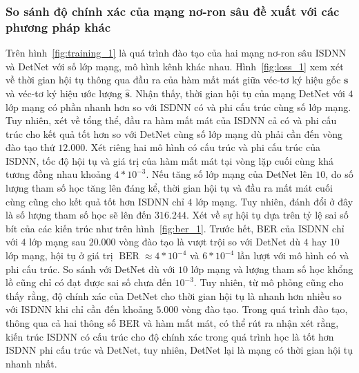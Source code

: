 \subsubsection{So sánh độ chính xác của mạng nơ-ron sâu đề xuất với các phương pháp khác}
Trên hình~\ref{fig:training_1} là quá trình đào tạo của hai mạng nơ-ron sâu ISDNN và DetNet với số lớp mạng, mô hình kênh khác nhau. Hình~\ref{fig:loss_1} xem xét về thời gian hội tụ thông qua đầu ra của hàm mất mát giữa véc-tơ ký hiệu gốc $\mathbf{s}$ và véc-tơ ký hiệu ước lượng $\mathbf{\hat{s}}$. Nhận thấy, thời gian hội tụ của mạng DetNet với $4$ lớp mạng có phần nhanh hơn so với ISDNN có và phi cấu trúc cùng số lớp mạng. Tuy nhiên, xét về tổng thể, đầu ra hàm mất mát của ISDNN cả có và phi cấu trúc cho kết quả tốt hơn so với DetNet cùng số lớp mạng dù phải cần đến vòng đào tạo thứ $12.000$. Xét riêng hai mô hình có cấu trúc và phi cấu trúc của ISDNN, tốc độ hội tụ và giá trị của hàm mất mát tại vòng lặp cuối cùng khá tương đồng nhau khoảng $4 * 10^{-3}$. Nếu tăng số lớp mạng của DetNet lên $10$, do số lượng tham số học tăng lên đáng kể, thời gian hội tụ và đầu ra mất mát cuối cùng cũng cho kết quả tốt hơn ISDNN chỉ $4$ lớp mạng. Tuy nhiên, đánh đổi ở đây là số lượng tham số học sẽ lên đến $316.244$. Xét về sự hội tụ dựa trên tỷ lệ sai số bít của các kiến trúc như trên hình~\ref{fig:ber_1}. Trước hết, BER của ISDNN chỉ với $4$ lớp mạng sau $20.000$ vòng đào tạo là vượt trội so với DetNet dù $4$ hay $10$ lớp mạng, hội tụ ở giá trị $\operatorname{BER}\approx 4 * 10^{-4}$ và $6*10^{-4}$ lần lượt với mô hình có và phi cấu trúc. So sánh với DetNet dù với $10$ lớp mạng và lượng tham số học khổng lồ cũng chỉ có đạt được sai số chưa đến $10^{-3}$. Tuy nhiên, từ mô phỏng cũng cho thấy rằng, độ chính xác của DetNet cho thời gian hội tụ là nhanh hơn nhiều so với ISDNN khi chỉ cần đến khoảng $5.000$ vòng đào tạo. Trong quá trình đào tạo, thông qua cả hai thông số BER và hàm mất mát, có thể rút ra nhận xét rằng, kiến trúc ISDNN có cấu trúc cho độ chính xác trong quá trình học là tốt hơn ISDNN phi cấu trúc và DetNet, tuy nhiên, DetNet lại là mạng có thời gian hội tụ nhanh nhất.


